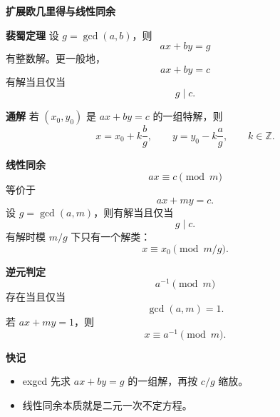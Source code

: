 \textbf{扩展欧几里得与线性同余}

\textbf{裴蜀定理}
设 $g=\gcd(a,b)$，则
\[
ax+by=g
\]
有整数解。更一般地，
\[
ax+by=c
\]
有解当且仅当
\[
g\mid c.
\]

\textbf{通解}
若 $(x_0,y_0)$ 是 $ax+by=c$ 的一组特解，则
\[
x=x_0+k\frac{b}{g},\qquad y=y_0-k\frac{a}{g},\qquad k\in\mathbb{Z}.
\]

\textbf{线性同余}
\[
ax\equiv c\pmod m
\]
等价于
\[
ax+my=c.
\]
设 $g=\gcd(a,m)$，则有解当且仅当
\[
g\mid c.
\]
有解时模 $m/g$ 下只有一个解类：
\[
x\equiv x_0 \pmod{m/g}.
\]

\textbf{逆元判定}
\[
a^{-1}\pmod m
\]
存在当且仅当
\[
\gcd(a,m)=1.
\]
若 $ax+my=1$，则
\[
x\equiv a^{-1}\pmod m.
\]

\textbf{快记}
\begin{itemize}
\item exgcd 先求 $ax+by=g$ 的一组解，再按 $c/g$ 缩放。
\item 线性同余本质就是二元一次不定方程。
\end{itemize}

